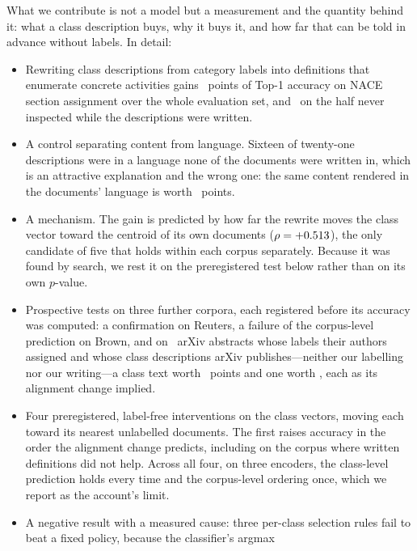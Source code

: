 \documentclass[11pt]{article}
\begin{document}
What we contribute is not a model but a measurement and the quantity behind
it: what a class description buys, why it buys it, and how far that can be
told in advance without labels. In detail:
\begin{itemize}
  \item Rewriting class descriptions from category labels into definitions that
        enumerate concrete activities gains \ContentEffect~points of Top-1
        accuracy on NACE section assignment over the whole evaluation set, and
        \HeldOutContentEffect\ on the half never inspected while the
        descriptions were written.
  \item A control separating content from language. Sixteen of twenty-one
        descriptions were in a language none of the documents were written in,
        which is an attractive explanation and the wrong one: the same content
        rendered in the documents' language is worth \LanguageEffect~points.
  \item A mechanism. The gain is predicted by how far the rewrite moves the
        class vector toward the centroid of its own documents
        ($\rho = +0.513$), the only candidate of five that holds within
        each corpus separately. Because it was found by search, we rest it on
        the preregistered test below rather than on its own $p$-value.
  \item Prospective tests on three further corpora, each registered before its
        accuracy was computed: a confirmation on Reuters, a failure of the
        corpus-level prediction on Brown, and on \ArxivN\ arXiv abstracts whose
        labels their authors assigned and whose class descriptions arXiv
        publishes---neither our labelling nor our writing---a class text
        worth \ArxivSpellGain~points and one worth \ArxivDescGain, each as its
        alignment change implied.
  \item Four preregistered, label-free interventions on the class vectors,
        moving each toward its nearest unlabelled documents. The first raises
        accuracy in the order the alignment change predicts, including on the
        corpus where written definitions did not help. Across all four, on three
        encoders, the class-level prediction holds every time and the
        corpus-level ordering once, which we report as the account's limit.
  \item A negative result with a measured cause: three per-class selection
        rules fail to beat a fixed policy, because the classifier's argmax

\end{itemize}
\end{document}
